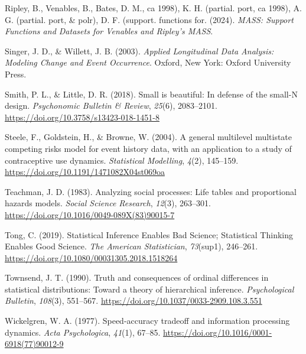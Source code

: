 \documentclass[
  man, donotrepeattitle,floatsintext]{apa6}
\newlength{\cslhangindent}
\newenvironment{CSLReferences}[2] %
 {\begin{list}{}{%
  \setlength{\itemindent}{0pt}
  \setlength{\leftmargin}{0pt}
  \setlength{\parsep}{0pt}
  \ifodd #1
   \setlength{\leftmargin}{\cslhangindent}
   \setlength{\itemindent}{-1\cslhangindent}
  \fi
  \setlength{\itemsep}{#2\baselineskip}}}
 {\end{list}}
\begin{document}
\begin{CSLReferences}{1}{0}
Ripley, B., Venables, B., Bates, D. M., ca 1998), K. H. (partial. port, ca 1998), A. G. (partial. port, \& polr), D. F. (support. functions for. (2024). \emph{{MASS}: {Support Functions} and {Datasets} for {Venables} and {Ripley}'s {MASS}}.

Singer, J. D., \& Willett, J. B. (2003). \emph{Applied {Longitudinal Data Analysis}: {Modeling Change} and {Event Occurrence}}. Oxford, New York: Oxford University Press.

Smith, P. L., \& Little, D. R. (2018). Small is beautiful: {In} defense of the small-{N} design. \emph{Psychonomic Bulletin \& Review}, \emph{25}(6), 2083--2101. \url{https://doi.org/10.3758/s13423-018-1451-8}

Steele, F., Goldstein, H., \& Browne, W. (2004). A general multilevel multistate competing risks model for event history data, with an application to a study of contraceptive use dynamics. \emph{Statistical Modelling}, \emph{4}(2), 145--159. \url{https://doi.org/10.1191/1471082X04st069oa}

Teachman, J. D. (1983). Analyzing social processes: {Life} tables and proportional hazards models. \emph{Social Science Research}, \emph{12}(3), 263--301. \url{https://doi.org/10.1016/0049-089X(83)90015-7}

Tong, C. (2019). Statistical {Inference Enables Bad Science}; {Statistical Thinking Enables Good Science}. \emph{The American Statistician}, \emph{73}(sup1), 246--261. \url{https://doi.org/10.1080/00031305.2018.1518264}

Townsend, J. T. (1990). Truth and consequences of ordinal differences in statistical distributions: {Toward} a theory of hierarchical inference. \emph{Psychological Bulletin}, \emph{108}(3), 551--567. \url{https://doi.org/10.1037/0033-2909.108.3.551}

Wickelgren, W. A. (1977). Speed-accuracy tradeoff and information processing dynamics. \emph{Acta Psychologica}, \emph{41}(1), 67--85. \url{https://doi.org/10.1016/0001-6918(77)90012-9}


\end{CSLReferences}
\end{document}
